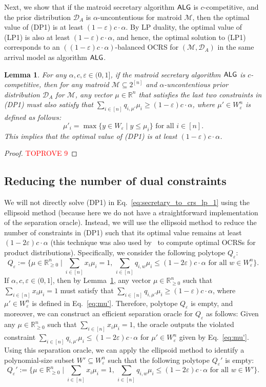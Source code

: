 \documentclass[11pt]{article}
\newcommand{\D}{\mathcal D}
\newcommand{\M}{{\mathcal M}}
\newcommand{\alg}{\textnormal{\sffamily ALG}}
\newcommand{\eps}{\varepsilon}
\newcommand{\R}{{\mathbb R}}
\newtheorem{lemma}[theorem]{Lemma}
\begin{document}
Next, we show that if the matroid secretary algorithm $\alg$ is $c$-competitive, and the prior distribution $\D_A$ is $\alpha$-uncontentious for matroid $\M$, then the optimal value of (DP1) is at least $(1-\eps)c\cdot\alpha$. By LP duality, the optimal value of (LP1) is also at least $(1-\eps)c\cdot\alpha$, and hence, the optimal solution to (LP1) corresponds to an $((1-\eps)c\cdot\alpha)$-balanced OCRS for $(\M,\D_A)$ in the same arrival model as algorithm $\alg$.

\begin{lemma}\label{lem:secretary_to_crs_dual}
For any $\alpha,c,\eps\in(0,1]$, if the matroid secretary algorithm $\alg$ is $c$-competitive, then for any matroid $\M\subseteq2^{[n]}$ and $\alpha$-uncontentious prior distribution $\D_A$ for $\M$, any vector $\mu\in\R^n$ that satisfies the last two constraints in (DP1) must also satisfy that $\sum_{i\in[n]} q_{i,\mu'}\mu_i\ge(1-\eps)c\cdot\alpha$, where $\mu'\in W_{\eps}^n$ is defined as follows:
\begin{equation}\label{eq:mu'}
\mu'_i=\max\{y\in W_{\eps}\mid y\le\mu_i\} \textrm{ for all } i\in[n].
\end{equation}
This implies that the optimal value of (DP1) is at least $(1-\eps)c\cdot\alpha$.
\end{lemma}
\begin{proof}\textcolor{red}{TOPROVE 9}\end{proof}
\subsection{Reducing the number of dual constraints}
We will not directly solve (DP1) in Eq.~\eqref{eq:secretary_to_crs_lp_1} using the ellipsoid method (because here we do not have a straightforward implementation of the separation oracle). Instead, we will use the ellipsoid method to reduce the number of constraints in (DP1) such that its optimal value remains at least $(1-2\eps)c\cdot\alpha$ (this technique was also used by~\citet{lee2018optimal} to compute optimal OCRSs for product distributions). Specifically, we consider the following polytope $Q_{\eps}$:
\[
    Q_{\eps}:=\{\mu\in\R_{\ge0}^n\mid \sum_{i\in[n]}x_i\mu_i=1,\,\sum_{i\in[n]} q_{i,w}\mu_i\le (1-2\eps)c\cdot\alpha\textrm{ for all }w\in W_{\eps}^n\}.
\]
If $\alpha,c,\eps\in(0,1]$, then by Lemma~\ref{lem:secretary_to_crs_dual}, any vector $\mu\in\R_{\ge0}^n$ such that $\sum_{i\in[n]}x_i\mu_i=1$ must satisfy that $\sum_{i\in[n]} q_{i,\mu'}\mu_i\ge (1-\eps)c\cdot\alpha$, where $\mu'\in W_{\eps}^n$ is defined in Eq.~\eqref{eq:mu'}. Therefore, polytope $Q_{\eps}$ is empty, and moreover, we can construct an efficient separation oracle for $Q_{\eps}$ as follows: Given any $\mu\in\R_{\ge0}^n$ such that $\sum_{i\in[n]}x_i\mu_i=1$, the oracle outputs the violated constraint $\sum_{i\in[n]} q_{i,\mu'}\mu_i\le (1-2\eps)c\cdot\alpha$ for $\mu'\in W_{\eps}^n$ given by Eq.~\eqref{eq:mu'}. Using this separation oracle, we can apply the ellipsoid method to identify a polynomial-size subset $W'\subseteq W_{\eps}^n$ such that the following polytope $Q_{\eps}'$ is empty:
\[
    Q_{\eps}':=\{\mu\in\R_{\ge0}^n\mid \sum_{i\in[n]}x_i\mu_i=1,\,\sum_{i\in[n]} q_{i,w}\mu_i\le (1-2\eps)c\cdot\alpha\textrm{ for all }w\in W'\}.
\]
\end{document}
